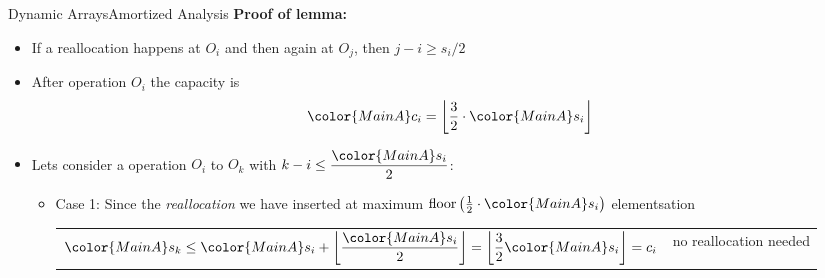 \begin{frame}{Dynamic Arrays}{Amortized Analysis}
  \textbf{Proof of lemma:}
  \begin{itemize}
  \item
    If a reallocation happens at {\color{MainA}$O_i$} and then again at {\color{MainA}$O_j$}, then {\color{MainA}$j - i\geq s_i/2$}
    \item
      After operation {\color{MainA}$O_i$} the capacity is
      \[
        {\color{MainA}c_i}
        = \left\lfloor\frac{3}{2}\cdot{\color{MainA}s_i}\right\rfloor
      \]
    \item
      Lets consider a operation {\color{MainA}$O_i$} to {\color{MainA}$O_k$} with
      $k -i \leq \dfrac{\color{MainA}s_i}{2}$:
      \begin{itemize}
        \item
          Case 1: Since the \textit{reallocation} we have inserted at
          maximum
          $\mathrm{floor}\left(
            \frac{1}{2} \cdot {\color{MainA}s_i}
          \right)$ elementsation
          \vspace{0.5em}\\
          \begin{tabularx}{\linewidth}{Xr}
            ${\color{MainA}s_k}
              \leq {\color{MainA}s_i} +
                \left\lfloor
                  \dfrac{\color{MainA}s_i}{2}
                  \vphantom{\dfrac{3}{2}}
                \right\rfloor
              = \left\lfloor\dfrac{3}{2} {\color{MainA}s_i}\right\rfloor
              = c_i$ &
              {\color{MainA}no reallocation needed}
          \end{tabularx}
      \end{itemize}
  \end{itemize}
\end{frame}


